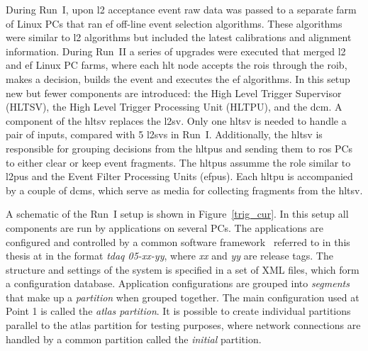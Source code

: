 \par During Run~I, upon \acrshort{l2} acceptance event raw data was passed to a
separate farm of Linux PCs that ran \acrshort{ef} off-line event selection algorithms. 
These algorithms were similar to \acrshort{l2} 
algorithms but included the latest calibrations and alignment information. During Run~II a series of upgrades 
were executed that merged \acrshort{l2} and \acrshort{ef} Linux PC farms, where each \acrshort{hlt} node accepts
the \acrshort{roi}s through the \acrshort{roib}, makes a decision, 
builds the event and executes the \acrshort{ef} algorithms. In this setup new but fewer components 
are introduced: the High Level Trigger Supervisor (HLTSV), the High Level Trigger Processing Unit
 (HLTPU), and the \acrshort{dcm}. 
A component of the \acrshort{hltsv} replaces the \acrshort{l2sv}. Only one \acrshort{hltsv}
is needed to handle a pair of inputs, compared with 5 \acrshort{l2sv}s in Run~I. 
Additionally, the \acrshort{hltsv} is responsible for grouping decisions from the \acrshort{hltpu}s 
and sending them to \acrshort{ros} PCs to either clear or keep event fragments. The \acrshort{hltpu}s assumme the 
role similar to \acrshort{l2pu}s and the Event Filter Processing Units (\acrshort{efpu}s).
Each \acrshort{hltpu} is accompanied by a couple of \acrshort{dcm}s,
 which serve as media for collecting fragments from the \acrshort{hltsv}.  

\par A schematic of the Run~I setup is shown in Figure~\ref{trig_cur}. In this setup all components are run by
 applications on several PCs. The applications are configured and controlled by a 
common software framework~\cite{Barczyk:2003ya} referred to in this thesis at in 
the format {\it tdaq 05-xx-yy}, where {\it xx} and {\it yy} are release tags.
 The structure and settings of the system is specified in a set 
of XML files, which form a configuration database. Application configurations are grouped 
into {\it segments} that make up a {\it partition} when grouped together.
 The main configuration used at Point 1 
is called the {\it \acrshort{atlas} partition}. It is possible to create individual partitions 
parallel to the \acrshort{atlas}  partition for testing purposes, where 
network connections are handled by a common partition called the {\it initial} partition.

